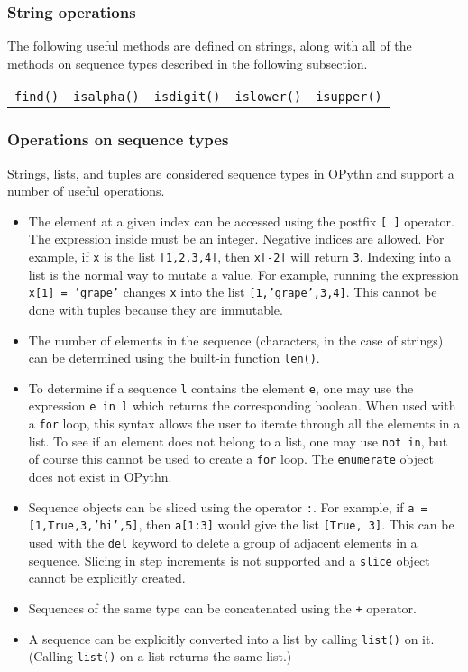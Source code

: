 \documentclass[11pt, twoside]{article}
\newcommand{\ms}{\texttt}
\begin{document}
    \subsubsection{String operations}
    The following useful methods are defined on strings, along with all of the methods on sequence types described in the following subsection.
    \begin{center}
        \begin{tabular}{ccccc}
            \ms{find()} & \ms{isalpha()} & \ms{isdigit()} & \ms{islower()} & \ms{isupper()}\\
    \end{tabular}
    \end{center}

    \subsubsection{Operations on sequence types}
    Strings, lists, and tuples are considered sequence types in OPythn and support a number of useful operations.
    \begin{itemize}
        \item The element at a given index can be accessed using the postfix \ms{[ ]} operator. The expression inside must be an integer. Negative indices are allowed. For example, if \ms{x} is the list \ms{[1,2,3,4]}, then \ms{x[-2]} will return \ms{3}. Indexing into a list is the normal way to mutate a value. For example, running the expression \ms{x[1] = 'grape'} changes \ms{x} into the list \ms{[1,'grape',3,4]}. This cannot be done with tuples because they are immutable.
        \item The number of elements in the sequence (characters, in the case of strings) can be determined using the built-in function \ms{len()}.
        \item To determine if a sequence \ms{l} contains the element \ms{e}, one may use the expression \ms{e in l} which returns the corresponding boolean. When used with a \ms{for} loop, this syntax allows the user to iterate through all the elements in a list. To see if an element does not belong to a list, one may use \ms{not in}, but of course this cannot be used to create a \ms{for} loop. The \ms{enumerate} object does not exist in OPythn.
        \item Sequence objects can be sliced using the operator \ms{:}. For example, if \ms{a = [1,True,3,'hi',5]}, then \ms{a[1:3]} would give the list \ms{[True, 3]}. This can be used with the \ms{del} keyword to delete a group of adjacent elements in a sequence. Slicing in step increments is not supported and a \ms{slice} object cannot be explicitly created.
        \item Sequences of the same type can be concatenated using the \ms{+} operator.
        \item A sequence can be explicitly converted into a list by calling \ms{list()} on it. (Calling \ms{list()} on a list returns the same list.)
    \end{itemize}
\end{document}
